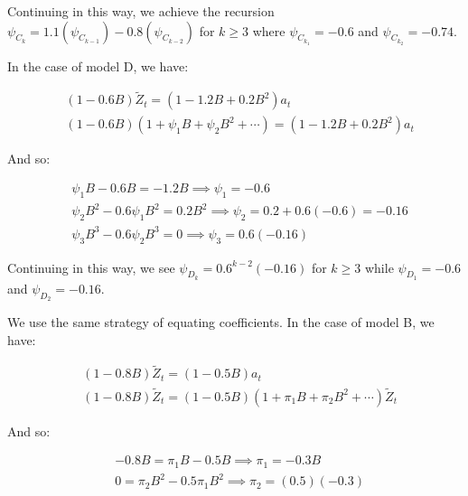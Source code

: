 \documentclass[12pt, letterpaper]{article}
\theoremstyle{definition}
\numberwithin{equation}{section}
\newcommand{\+}[1]{+_{\scalebox{.375}{#1}}}
\newcommand{\1}{\mathbbm{1}}
\begin{document}
Continuing in this way, we achieve the recursion $\psi_{C_k}=1.1(\psi_{C_{k-1}})-0.8(\psi_{C_{k-2}})$ for $k\geq 3$ where $\psi_{C_{k_1}}=-0.6$ and $\psi_{C_{k_2}}=-0.74$.
\vspace{\baselineskip}
\vspace{\baselineskip}
\vspace{\baselineskip}



In the case of model D, we have:

\vspace{-0.5cm}
\begin{align*}
	&(1-0.6B)\tilde{Z}_t=(1-1.2B+0.2B^2)a_t\\
	&(1-0.6B)\left(1+\psi_1B+\psi_2B^2+\cdots\right)=(1-1.2B+0.2B^2)a_t
\end{align*}
\vspace{-0.5cm}
 
 And so:
 
 \vspace{-0.5cm}
 \begin{align*}
 	&\psi_1B-0.6B=-1.2B \implies \psi_1=-0.6\\
 	&\psi_2B^2-0.6\psi_1B^2=0.2B^2 \implies \psi_2=0.2+0.6(-0.6)=-0.16\\
 	&\psi_3B^3-0.6\psi_2B^3=0 \implies \psi_3=0.6(-0.16)
 \end{align*}
\vspace{-0.5cm}

Continuing in this way, we see $\psi_{D_k}=0.6^{k-2}(-0.16)$ for $k \geq 3$ while $\psi_{D_1}=-0.6$ and $\psi_{D_2}=-0.16$.



\newpage
\noindent\textbf{}
\vspace{\baselineskip}

We use the same strategy of equating coefficients. In the case of model B, we have:

\vspace{-0.5cm}
\begin{align*}
	&(1-0.8B)\tilde{Z}_t=(1-0.5B)a_t\\
	&(1-0.8B)\tilde{Z}_t=(1-0.5B)(1+\pi_1B+\pi_2B^2+\cdots)\tilde{Z}_t
\end{align*}
\vspace{-0.5cm}

And so:

\vspace{-0.5cm}
\begin{align*}
	&-0.8B=\pi_1B-0.5B \implies \pi_1=-0.3B\\
	&0=\pi_2B^2-0.5\pi_1B^2 \implies \pi_2=(0.5)(-0.3)
\end{align*}
\vspace{-0.5cm}
\end{document}
